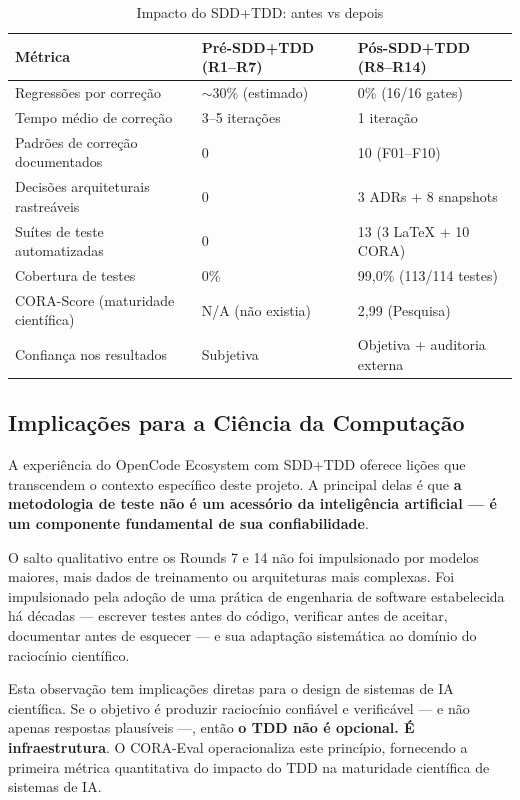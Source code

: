 \begin{table}[H]\centering
\caption{Impacto do SDD+TDD: antes vs depois}
\label{tab:before_after}
\begin{tabular}{p{}p{}p{}}
\toprule
\textbf{Métrica} & \textbf{Pré-SDD+TDD (R1--R7)} & \textbf{Pós-SDD+TDD (R8--R14)} \\
\midrule
Regressões por correção & $\sim$30\% (estimado) & 0\% (16/16 gates) \\
Tempo médio de correção & 3--5 iterações & 1 iteração \\
Padrões de correção documentados & 0 & 10 (F01--F10) \\
Decisões arquiteturais rastreáveis & 0 & 3 ADRs + 8 snapshots \\
Suítes de teste automatizadas & 0 & 13 (3 LaTeX + 10 CORA) \\
Cobertura de testes & 0\% & 99,0\% (113/114 testes) \\
CORA-Score (maturidade científica) & N/A (não existia) & 2,99 (Pesquisa) \\
Confiança nos resultados & Subjetiva & Objetiva + auditoria externa \\
\bottomrule
\end{tabular}
\end{table}

\subsection{Implicações para a Ciência da Computação}

A experiência do OpenCode Ecosystem com SDD+TDD oferece lições que transcendem
o contexto específico deste projeto. A principal delas é que \textbf{a
metodologia de teste não é um acessório da inteligência artificial — é um
componente fundamental de sua confiabilidade}.

O salto qualitativo entre os Rounds 7 e 14 não foi impulsionado por modelos
maiores, mais dados de treinamento ou arquiteturas mais complexas. Foi
impulsionado pela adoção de uma prática de engenharia de software estabelecida
há décadas — escrever testes antes do código, verificar antes de aceitar,
documentar antes de esquecer — e sua adaptação sistemática ao domínio do
raciocínio científico.

Esta observação tem implicações diretas para o design de sistemas de IA
científica. Se o objetivo é produzir raciocínio confiável e verificável — e
não apenas respostas plausíveis —, então \textbf{o TDD não é opcional. É
infraestrutura}. O CORA-Eval operacionaliza este princípio, fornecendo a
primeira métrica quantitativa do impacto do TDD na maturidade científica de
sistemas de IA.
